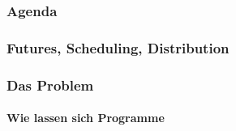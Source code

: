 \documentclass{beamer}
\begin{document}
\frame{\titlepage}

\begin{frame}
\frametitle{Agenda}
\tableofcontents[currentsection]
\end{frame}




\begin{frame}

\frametitle{Futures, Scheduling, Distribution}

\end{frame}


\begin{frame}

\frametitle{Das Problem}
\framesubtitle{Wie lassen sich Programme }

\end{frame}
\end{document}
